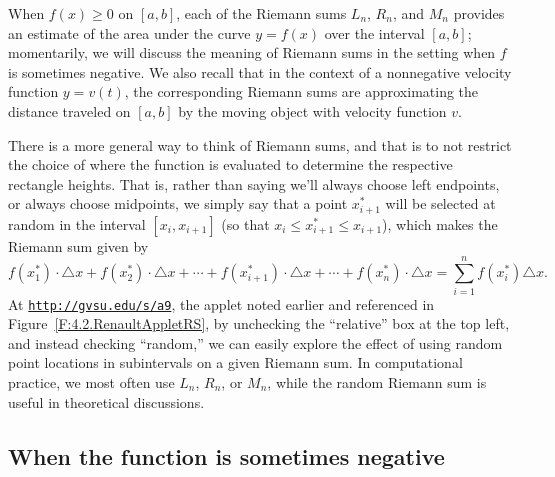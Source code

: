 When $f(x) \ge 0$ on $[a,b]$, each of the Riemann sums $L_n$, $R_n$, and $M_n$ provides an estimate of the area under the curve $y = f(x)$ over the interval $[a,b]$; momentarily, we will discuss the meaning of Riemann sums in the setting when $f$ is sometimes negative.  We also recall that in the context of a nonnegative velocity function $y = v(t)$, the corresponding Riemann sums are approximating the distance traveled on $[a,b]$ by the moving object with velocity function $v$.

There is a more general way to think of Riemann sums, and that is to not restrict the choice of where the function is evaluated to determine the respective rectangle heights.  That is, rather than saying we'll always choose left endpoints, or always choose midpoints, we simply say that a point $x_{i+1}^*$ will be selected at random in the interval $[x_i, x_{i+1}]$ (so that $x_i \le x_{i+1}^* \le x_{i+1}$), which makes the Riemann sum given by 
$$f(x_1^*) \cdot \triangle x + f(x_2^*) \cdot \triangle x + \cdots + f(x_{i+1}^*) \cdot \triangle x + \cdots + f(x_n^*) \cdot \triangle x = \sum_{i=1}^{n} f(x_i^*) \triangle x.$$
At \href{http://gvsu.edu/s/a9}{\texttt{http://gvsu.edu/s/a9}}, the applet noted earlier and referenced in Figure~\ref{F:4.2.RenaultAppletRS}, by unchecking the ``relative'' box at the top left, and instead checking ``random,'' we can easily explore the effect of using random point locations in subintervals on a given Riemann sum.  In computational practice, we most often use $L_n$, $R_n$, or $M_n$, while the random Riemann sum is useful in theoretical discussions.  
 

\subsection*{When the function is sometimes negative}


